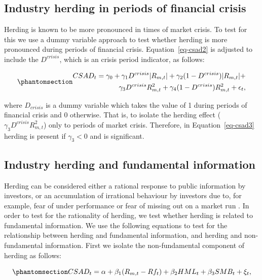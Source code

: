 \documentclass[
  letterpaper,
  DIV=11,
  numbers=noendperiod]{scrartcl}
\begin{document}
\subsection{Industry herding in periods of financial
crisis}\label{industry-herding-in-periods-of-financial-crisis}

Herding is known to be more pronounced in times of market crisis. To
test for this we use a dummy variable approach to test whether herding
is more pronounced during periods of financial crisis.
Equation~\ref{eq-csad2} is adjusted to include the \(D^{crisis}\), which
is an crisis period indicator, as follows:

\begin{equation}\phantomsection\label{eq-csad3}{
\begin{aligned}
CSAD_{t} = \gamma_0 +  \gamma_1D^{crisis}|R_{m, t}| + \gamma_2(1 - D^{crisis})|R_{m,t}| + \\  \gamma_3D^{crisis}R_{m, t}^2 + \gamma_4(1-D^{crisis})R_{m,t}^2 + \epsilon_{t},
\end{aligned}
}\end{equation}

where \(D_{crisis}\) is a dummy variable which takes the value of 1
during periods of financial crisis and 0 otherwise. That is, to isolate
the herding effect (\(\gamma_3D^{crisis}R_{m, t}^2\)) only to periods of
market crisis. Therefore, in Equation~\ref{eq-csad3} herding is present
if \(\gamma_3 < 0\) and is significant.

\subsection{Industry herding and fundamental
information}\label{industry-herding-and-fundamental-information}

Herding can be considered either a rational response to public
information by investors, or an accumulation of irrational behaviour by
investors due to, for example, fear of under performance or fear of
missing out on a market run \citep[see][]{Bikhchandani2001}. In order to
test for the rationality of herding, we test whether herding is related
to fundamental information. We use the following equations to test for
the relationship between herding and fundamental information, and
herding and non-fundamental information. First we isolate the
non-fundamental component of herding as follows:

\begin{equation}\phantomsection\label{eq-info}{
CSAD_t = \alpha + \beta_1(R_{m,t} - Rf_t) + \beta_2HML_t + \beta_3SMB_t + \xi_t,
}\end{equation}
\end{document}
